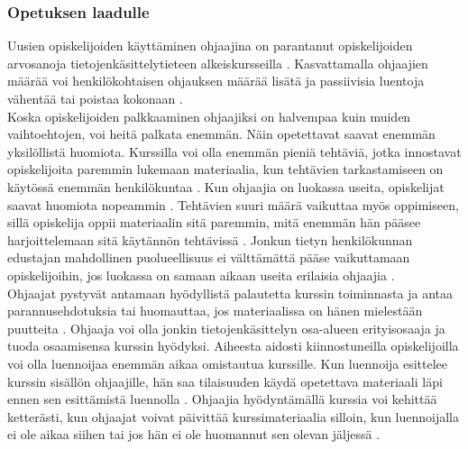\documentclass[finnish]{tktltiki2}
\theoremstyle{definition}
\theoremstyle{remark}
\begin{document}
\subsubsection{Opetuksen laadulle}
Uusien opiskelijoiden käyttäminen ohjaajina on parantanut opiskelijoiden arvosanoja tietojenkäsittelytieteen alkeiskursseilla \cite{Decker06, Kurhila11}. Kasvattamalla ohjaajien määrää voi henkilökohtaisen ohjauksen määrää lisätä ja passiivisia luentoja vähentää tai poistaa kokonaan \cite{Kurhila11}.
\\
Koska opiskelijoiden palkkaaminen ohjaajiksi on halvempaa kuin muiden vaihtoehtojen, voi heitä palkata enemmän. Näin opetettavat saavat enemmän yksilöllistä huomiota. Kurssilla voi olla enemmän pieniä tehtäviä, jotka innostavat opiskelijoita paremmin lukemaan materiaalia, kun tehtävien tarkastamiseen on käytössä enemmän henkilökuntaa \cite{Dickson11}. Kun ohjaajia on luokassa useita, opiskelijat saavat huomiota nopeammin \cite{Ferstl10}. Tehtävien suuri määrä vaikuttaa myös oppimiseen, sillä opiskelija oppii materiaalin sitä paremmin, mitä enemmän hän pääsee harjoittelemaan sitä käytännön tehtävissä \cite{Vikberg}. Jonkun tietyn henkilökunnan edustajan mahdollinen puolueellisuus ei välttämättä pääse vaikuttamaan opiskelijoihin, jos luokassa on samaan aikaan useita erilaisia ohjaajia \cite{Morgan02}.
\\
Ohjaajat pystyvät antamaan hyödyllistä palautetta kurssin toiminnasta ja antaa parannusehdotuksia \cite{Decker06} tai huomauttaa, jos materiaalissa on hänen mielestään puutteita \cite{Dickson11}. Ohjaaja voi olla jonkin tietojenkäsittelyn osa-alueen erityisosaaja ja tuoda osaamisensa kurssin hyödyksi. Aiheesta aidosti kiinnostuneilla opiskelijoilla voi olla luennoijaa enemmän aikaa omistautua kurssille. Kun luennoija esittelee kurssin sisällön ohjaajille, hän saa tilaisuuden käydä opetettava materiaali läpi ennen sen esittämistä luennolla \cite{Kopp00}. Ohjaajia hyödyntämällä kurssia voi kehittää ketterästi, kun ohjaajat voivat päivittää kurssimateriaalia silloin, kun luennoijalla ei ole aikaa siihen tai jos hän ei ole huomannut sen olevan jäljessä \cite{Dickson11}.
\end{document}
